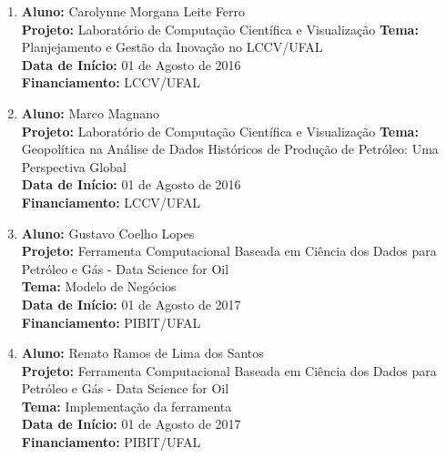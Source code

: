 \documentclass[a4paper,oneside,10pt]{article}
\begin{document}
\begin{enumerate}
\renewcommand{\labelenumi}{{\large\bfseries\arabic{enumi}.}}

\item    \textbf{Aluno:} Carolynne Morgana Leite Ferro \mbox{} \\
             \textbf{Projeto:}  Laboratório de Computação Científica e Visualização
             \textbf{Tema:} Planjejamento e Gestão da Inovação no LCCV/UFAL\\
             \textbf{Data de Início:} 01 de Agosto de 2016\\
             \textbf{Financiamento:} LCCV/UFAL
             
 \item    \textbf{Aluno:} Marco Magnano \mbox{} \\
             \textbf{Projeto:}  Laboratório de Computação Científica e Visualização
             \textbf{Tema:} Geopolítica na Análise de Dados Históricos de Produção de Petróleo: Uma Perspectiva Global \\
             \textbf{Data de Início:} 01 de Agosto de 2016\\
             \textbf{Financiamento:} LCCV/UFAL
             
\item    \textbf{Aluno:} Gustavo Coelho Lopes \mbox{} \\
             \textbf{Projeto:} Ferramenta  Computacional Baseada em Ciência dos Dados para Petróleo e Gás - Data Science for Oil \\
             \textbf{Tema:} Modelo de Negócios \\
             \textbf{Data de Início:} 01 de Agosto de 2017\\
             \textbf{Financiamento:} PIBIT/UFAL

\item    \textbf{Aluno:} Renato Ramos de Lima dos Santos \mbox{} \\
             \textbf{Projeto:} Ferramenta  Computacional Baseada em Ciência dos Dados para Petróleo e Gás - Data Science for Oil \\
             \textbf{Tema:} Implementação da ferramenta \\
             \textbf{Data de Início:} 01 de Agosto de 2017\\
             \textbf{Financiamento:} PIBIT/UFAL
             

\end{enumerate}
\end{document}
